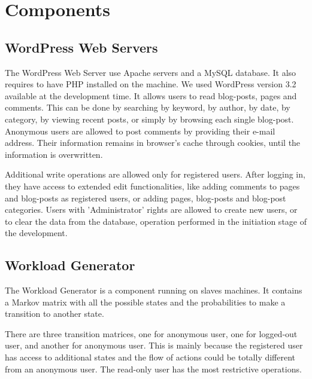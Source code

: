 
\section{Components}
\label{sec:components}

\subsection{WordPress Web Servers}
\label{sub-sec:wordpress-web-servers}

The WordPress Web Server use Apache servers and a MySQL database. It also requires to have PHP installed on the machine. We used WordPress version 3.2 available at the development time. It allows users to read blog-posts, pages and comments. This can be done by searching by keyword, by author, by date, by category, by viewing recent posts, or simply by browsing each single blog-post. Anonymous users are allowed to post comments by providing their e-mail address. Their information remains in browser's cache through cookies, until the information is overwritten.

Additional write operations are allowed only for registered users. After logging in, they have access to extended edit functionalities, like adding comments to pages and blog-posts as registered users, or adding pages, blog-posts and blog-post categories. Users with 'Administrator' rights are allowed to create new users, or to clear the data from the database, operation performed in the initiation stage of the development.

\subsection{Workload Generator}
\label{sub-sec:workload-generator}

The Workload Generator is a component running on slaves machines. It contains a Markov matrix with all the possible states and the probabilities to make a transition to another state. 

There are three transition matrices, one for anonymous user, one for logged-out user, and another for anonymous user. This is mainly because the registered user has access to additional states and the flow of actions could be totally different from an anonymous user. The read-only user has the most restrictive operations.

